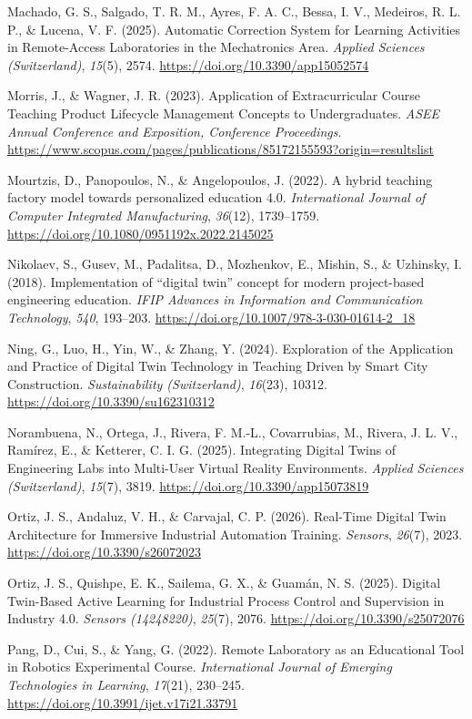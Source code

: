 Machado, G. S., Salgado, T. R. M., Ayres, F. A. C., Bessa, I. V.,
Medeiros, R. L. P., \& Lucena, V. F. (2025). Automatic Correction System
for Learning Activities in Remote-Access Laboratories in the
Mechatronics Area. \emph{Applied Sciences (Switzerland)}, \emph{15}(5), 2574.
\url{https://doi.org/10.3390/app15052574}

Morris, J., \& Wagner, J. R. (2023). Application of Extracurricular
Course Teaching Product Lifecycle Management Concepts to Undergraduates.
\emph{ASEE Annual Conference and Exposition, Conference Proceedings}.
\url{https://www.scopus.com/pages/publications/85172155593?origin=resultslist}

Mourtzis, D., Panopoulos, N., \& Angelopoulos, J. (2022). A hybrid
teaching factory model towards personalized education 4.0.
\emph{International Journal of Computer Integrated Manufacturing}, \emph{36}(12),
1739--1759. \url{https://doi.org/10.1080/0951192x.2022.2145025}

Nikolaev, S., Gusev, M., Padalitsa, D., Mozhenkov, E., Mishin, S., \&
Uzhinsky, I. (2018). Implementation of ``digital twin'' concept for modern
project-based engineering education. \emph{IFIP Advances in Information and
Communication Technology}, \emph{540}, 193--203.
\url{https://doi.org/10.1007/978-3-030-01614-2_18}

Ning, G., Luo, H., Yin, W., \& Zhang, Y. (2024). Exploration of the
Application and Practice of Digital Twin Technology in Teaching Driven
by Smart City Construction. \emph{Sustainability (Switzerland)}, \emph{16}(23),
10312. \url{https://doi.org/10.3390/su162310312}

Norambuena, N., Ortega, J., Rivera, F. M.-L., Covarrubias, M., Rivera,
J. L. V., Ramírez, E., \& Ketterer, C. I. G. (2025). Integrating Digital
Twins of Engineering Labs into Multi-User Virtual Reality Environments.
\emph{Applied Sciences (Switzerland)}, \emph{15}(7), 3819.
\url{https://doi.org/10.3390/app15073819}

Ortiz, J. S., Andaluz, V. H., \& Carvajal, C. P. (2026). Real-Time
Digital Twin Architecture for Immersive Industrial Automation Training.
\emph{Sensors}, \emph{26}(7), 2023. \url{https://doi.org/10.3390/s26072023}

Ortiz, J. S., Quishpe, E. K., Sailema, G. X., \& Guamán, N. S. (2025).
Digital Twin-Based Active Learning for Industrial Process Control and
Supervision in Industry 4.0. \emph{Sensors (14248220)}, \emph{25}(7), 2076.
\url{https://doi.org/10.3390/s25072076}

Pang, D., Cui, S., \& Yang, G. (2022). Remote Laboratory as an
Educational Tool in Robotics Experimental Course. \emph{International Journal
of Emerging Technologies in Learning}, \emph{17}(21), 230--245.
\url{https://doi.org/10.3991/ijet.v17i21.33791}

